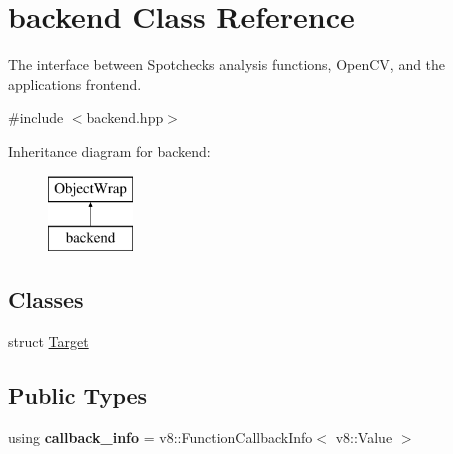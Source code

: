 \hypertarget{classbackend}{}\section{backend Class Reference}
\label{classbackend}


The interface between Spotcheck\textquotesingle{}s analysis functions, Open\+CV, and the application\textquotesingle{}s frontend.  




{\ttfamily \#include $<$backend.\+hpp$>$}

Inheritance diagram for backend\+:\begin{figure}[H]
\begin{center}
\leavevmode
\includegraphics[height=2.000000cm]{classbackend}
\end{center}
\end{figure}
\subsection*{Classes}
\begin{DoxyCompactItemize}
\item 
struct \hyperlink{structbackend_1_1_target}{Target}
\end{DoxyCompactItemize}
\subsection*{Public Types}
\begin{DoxyCompactItemize}
\item 
\mbox{\label{classbackend_aa165cfc3da158f073832ef1f6ce4e1b8}} 
using {\bfseries callback\+\_\+info} = v8\+::\+Function\+Callback\+Info$<$ v8\+::\+Value $>$
\end{DoxyCompactItemize}
